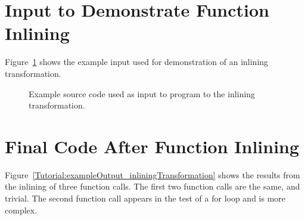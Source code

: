 \section{Input to Demonstrate Function Inlining}

   Figure~\ref{Tutorial:exampleInputCode_inliningTransformation}
shows the example input used for demonstration of an inlining transformation.

\begin{figure}[!h]
{\indent
{\mySmallFontSize

\begin{latexonly}
   
\end{latexonly}

\begin{htmlonly}
   
\end{htmlonly}

}
}
\caption{Example source code used as input to program to the inlining transformation.}
\label{Tutorial:exampleInputCode_inliningTransformation}
\end{figure}





\section{Final Code After Function Inlining}

   Figure~\ref{Tutorial:exampleOutput_inliningTransformation} 
shows the results from the inlining of three function calls.
The first two function calls are the same, and trivial. The
second function call appears in the test of a for loop and is
more complex.


